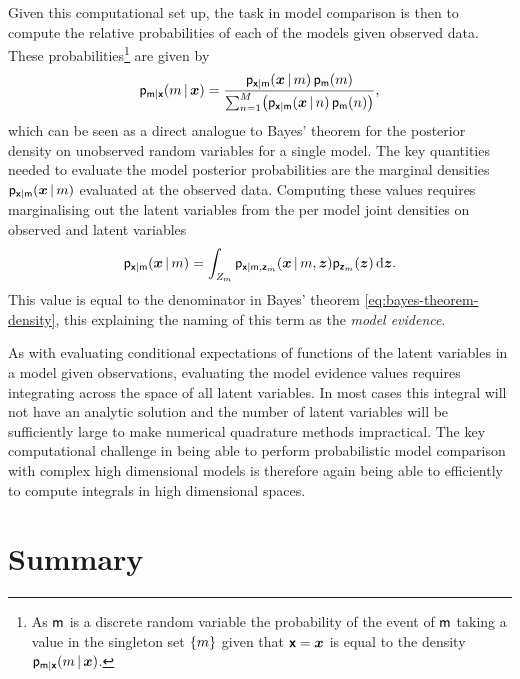 Given this computational set up, the task in model comparison is then to compute the relative probabilities of each of the models given observed data. These probabilities\footnote{As $\mathsf{m}$ is a discrete random variable the probability of the event of $\mathsf{m}$ taking a value in the singleton set $\fset{m}$ given that $\boldsymbol{\mathsf{x}} = \boldsymbol{x}$ is equal to the density $\mathsf{p}_{\mathsf{m}|\boldsymbol{\mathsf{x}}}(m\operatorname{|}\boldsymbol{x})$.} are given by
\begin{equation}\label{eq:model-posterior}
  \pden{\rvar{m}|\rvct{x}}(m\gvn\vct{x}) = 
  \frac{\pden{\rvct{x}|\rvar{m}}(\vct{x}\gvn m)\,\pden{\rvar{m}}(m)}
  {\sum_{n=1}^M \lpa \pden{\rvct{x}|\rvar{m}}(\vct{x}\gvn n)\,\pden{\rvar{m}}(n)\rpa},
\end{equation}
which can be seen as a direct analogue to Bayes' theorem for the posterior density on unobserved random variables for a single model. The key quantities needed to evaluate the model posterior probabilities are the marginal densities $\mathsf{p}_{\boldsymbol{\mathsf{x}}|\mathsf{m}}(\boldsymbol{x}\operatorname{|} m)$ evaluated at the observed data. Computing these values requires marginalising out the latent variables from the per model joint densities on observed and latent variables
\begin{equation}\label{eq:model-marginal-den}
  \mathsf{p}_{\boldsymbol{\mathsf{x}}|\mathsf{m}}(\boldsymbol{x}\operatorname{|} m) = 
  \int_{\mathit{Z}_m} \mathsf{p}_{\boldsymbol{\mathsf{x}}|\mathsf{m},\boldsymbol{\mathsf{z}}_m}(\boldsymbol{x}\operatorname{|} m, \boldsymbol{z}) \mathsf{p}_{\boldsymbol{\mathsf{z}}_m}(\boldsymbol{z})
  \,\mathrm{d}\boldsymbol{z}.
\end{equation}
This value is equal to the denominator in Bayes' theorem \eqref{eq:bayes-theorem-density}, this explaining the naming of this term as the \emph{model evidence}.

As with evaluating conditional expectations of functions of the latent variables in a model given observations, evaluating the model evidence values requires integrating across the space of all latent variables. In most cases this integral will not have an analytic solution and the number of latent variables will be sufficiently large to make numerical quadrature methods impractical. The key computational challenge in being able to perform probabilistic model comparison with complex high dimensional models is therefore again being able to efficiently to compute integrals in high dimensional spaces.

\section{Summary}

